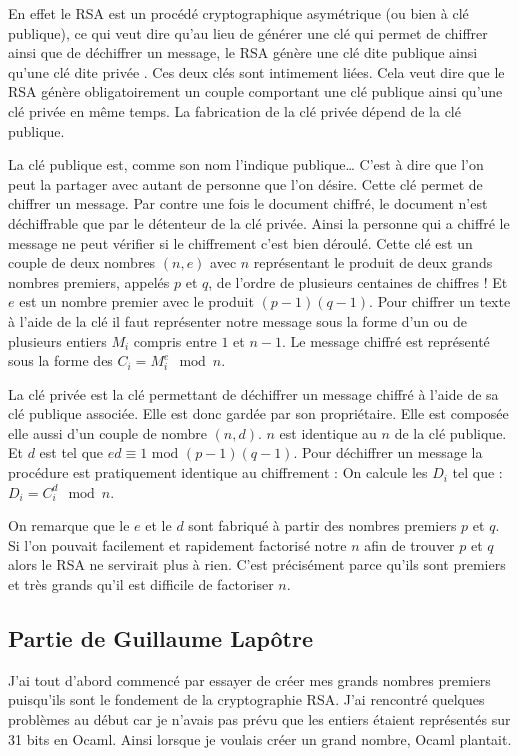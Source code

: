 \documentclass[a4paper,12pt]{article}
\begin{document}
En effet le RSA est un procédé cryptographique asymétrique (ou bien à clé publique), ce qui veut dire qu'au lieu de générer une clé qui permet de chiffrer ainsi que de déchiffrer un message, le RSA génère une clé dite \og publique \fg{} ainsi qu'une clé dite \og privée \fg{}. Ces deux clés sont intimement liées. Cela veut dire que le RSA génère obligatoirement un couple comportant une clé publique ainsi qu'une clé privée en même temps. La fabrication de la clé privée dépend de la clé publique.

La clé publique est, comme son nom l'indique publique\dots{} C'est à dire que l'on peut la partager avec autant de personne que l'on désire. Cette clé permet de chiffrer un message. Par contre une fois le document chiffré, le document n'est déchiffrable que par le détenteur de la clé privée. Ainsi la personne qui a chiffré le message ne peut vérifier si le chiffrement c'est bien déroulé. Cette clé est un couple de deux nombres $(n, e)$ avec $n$ représentant le produit de deux grands nombres premiers, appelés $p$ et $q$, de l'ordre de plusieurs centaines de chiffres ! Et $e$ est un nombre premier avec le produit $(p - 1)(q - 1)$. Pour chiffrer un texte à l'aide de la clé il faut représenter notre message sous la forme d'un ou de plusieurs entiers $M_{i}$ compris entre $1$ et $n - 1$. Le message chiffré est représenté sous la forme des $C_{i} = M_{i}^e \mod n$.

La clé privée est la clé permettant de déchiffrer un message chiffré à l'aide de sa clé publique associée. Elle est donc gardée par son propriétaire. Elle est composée elle aussi d'un couple de nombre $(n, d)$. $n$ est identique au $n$ de la clé publique. Et $d$ est tel que $ed \equiv 1 \textrm{ mod } (p - 1)(q - 1)$. Pour déchiffrer un message la procédure est pratiquement identique au chiffrement : On calcule les $D_{i}$ tel que : $D_{i} = C_{i}^d \mod n$.

On remarque que le $e$ et le $d$ sont fabriqué à partir des nombres premiers $p$ et $q$. Si l'on pouvait facilement et rapidement factorisé notre $n$ afin de trouver $p$ et $q$ alors le RSA ne servirait plus à rien. C'est précisément parce qu'ils sont premiers et très grands qu'il est difficile de factoriser $n$.

\subsection{Partie de Guillaume Lapôtre}

J'ai tout d'abord commencé par essayer de créer mes grands nombres premiers puisqu'ils sont le fondement de la cryptographie RSA. J'ai rencontré quelques problèmes au début car je n'avais pas prévu que les entiers étaient représentés sur 31 bits en Ocaml. Ainsi lorsque je voulais créer un grand nombre, Ocaml plantait.
\end{document}
